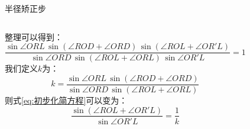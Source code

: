 \documentclass[aspectratio=169]{beamer}
\begin{document}
\begin{frame}{半径矫正步}
\begin{columns}
        整理可以得到：
        \begin{equation}
            \frac{\sin\angle ORL\,\sin\left(\angle ROD + \angle ORD\right)\,\sin\left(\angle ROL + \angle OR'L\right)}{\sin\angle ORD\,\sin\left(\angle ROL + \angle ORL\right)\,\sin\angle OR'L} = 1
            \label{eq:初步化简方程}
        \end{equation}
        我们定义$k$为：
        \begin{equation}
            k = \frac{\sin\angle ORL\,\sin\left(\angle ROD + \angle ORD\right)}{\sin\angle ORD\,\sin\left(\angle ROL + \angle ORL\right)}
        \end{equation}
        则式\ref{eq:初步化简方程}可以变为：
        \begin{equation}
            \frac{\sin\left(\angle ROL + \angle OR'L\right)}{\sin\angle OR'L} = \frac{1}{k}
        \end{equation}
    \end{columns}
\end{frame}
\end{document}
